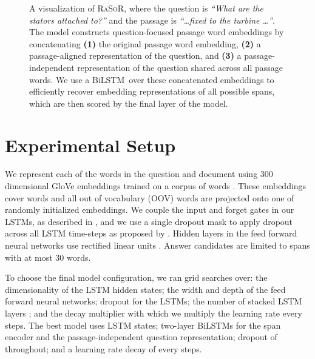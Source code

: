 \documentclass{article} \usepackage{iclr2017_conference,times}
\newcommand{\bilstm}{BiLSTM}
\newcommand{\ourmodel}{\textsc{RaSoR}}
\newcommand\layerbox[4]{
\draw[rounded corners] (#2, #3) rectangle (#2 + #1 * #4, #3 + #1 * 1);
}
\newcommand\layercolorbox[5]{
\draw[rounded corners, fill=#5] (#2, #3) rectangle (#2 + #1 * #4, #3 + #1 * 1);
}
\newcommand\layercomponent[5]{
\filldraw[fill=#5] (#2 + #1 * #4 - #1 * 0.5, #3 + #1 * 0.5) circle (#1 * 0.4);
}
\newcommand\layer[5][0.4] {
\layerbox{#1}{#2}{#3}{#4}
\foreach \x in {1, ..., #4}{
  \layercomponent{#1}{#2}{#3}{\x}{#5}
}
}
\begin{document}
\begin{figure}[t]
\begin{centering}
{
}
\caption{
A visualization of \ourmodel, where the question is \textit{``What are the stators attached to?''} and the passage is \textit{``\dots fixed to the turbine \dots''}.
The model constructs question-focused passage word embeddings by concatenating \textbf{(1)} the original passage word embedding, \textbf{(2)} a passage-aligned representation of the question, and \textbf{(3)} a passage-independent representation of the question shared across all passage words.
We use a \bilstm~over these concatenated embeddings to efficiently recover embedding representations of all possible spans, which are then scored by the final layer of the model.}
\label{fig:span}
\end{centering}
\end{figure}
  \section{Experimental Setup}
\label{sec:exp_setup}
We represent each of the words in the question and document using 300 dimensional GloVe embeddings trained on a corpus of  words \citep{pennington2014glove}.
These embeddings cover  words and all out of vocabulary (OOV) words are projected onto one of  randomly initialized  embeddings.
We couple the input and forget gates in our LSTMs, as described in \cite{greff2015lstm}, and we use a single dropout mask to apply dropout across all LSTM time-steps as proposed by \cite{gal2015theoretically}. Hidden layers in the feed forward neural networks use rectified linear units \citep{relu}.
Answer candidates are limited to spans with at most 30 words.

To choose the final model configuration, we ran grid searches over: the dimensionality of the LSTM hidden states; the width and depth of the feed forward neural networks; dropout for the LSTMs; the number of stacked LSTM layers ; and the decay multiplier  with which we multiply the learning rate every  steps.
The best model uses  LSTM states; two-layer \bilstm s for the span encoder and the passage-independent question representation; dropout of  throughout; and a learning rate decay of  every  steps.
\end{document}
